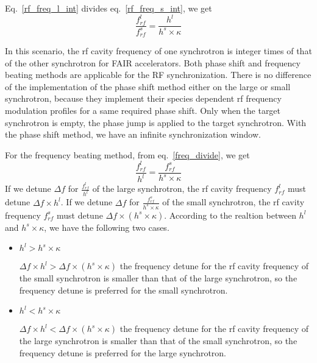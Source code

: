 Eq.~\ref{rf_freq_l_int} divides eq.~\ref{rf_freq_s_int}, we get
\begin{equation}
\frac{f_{rf}^{l}}{f_{rf}^{s}}= \frac{h^l}{h^s \times \kappa} \label{freq_divide}
\end{equation}


In this scenario, the rf cavity frequency of one synchrotron is integer times of that of the other synchrotron for FAIR accelerators. Both phase shift and frequency beating methods are applicable for the RF synchronization. There is no difference of the implementation of the phase shift method either on the large or small synchrotron, because they implement their species dependent rf frequency modulation profiles for a same required phase shift. Only when the target synchrotron is empty, the phase jump is applied to the target synchrotron. With the phase shift method, we have an infinite synchronization window. 

For the frequency beating method, from eq.~\ref{freq_divide}, we get
\begin{equation}
\frac{f_{rf}^{l}}{h^l}= \frac{f_{rf}^{s}}{h^s \times \kappa} 
\end{equation}
If we detune $\Delta f$ for $\frac{f_{rf}^{l}}{h^l}$ of the large synchrotron, the rf cavity frequency $ f_{rf}^{l}$ must detune $\Delta f \times h^l$. If we detune $\Delta f$ for $\frac{f_{rf}^{s}}{h^s \times \kappa}$ of the small synchrotron, the rf cavity frequency $ f_{rf}^{s}$ must detune $\Delta f \times (h^s \times \kappa)$. According to the realtion between $h^l$ and $h^s \times \kappa$, we have the following two cases.
\begin{itemize}
	\item $h^l > h^s \times \kappa$

$\Delta f \times h^l > \Delta f \times (h^s \times \kappa)$ the frequency detune for the rf cavity frequency of the small synchrotron is smaller than that of the large synchrotron, so the frequency detune is preferred for the small synchrotron.
	\item $h^l < h^s \times \kappa$

$\Delta f \times h^l < \Delta f \times (h^s \times \kappa)$ the frequency detune for the rf cavity frequency of the large synchrotron is smaller than that of the small synchrotron, so the frequency detune is preferred for the large synchrotron.
\end{itemize}

